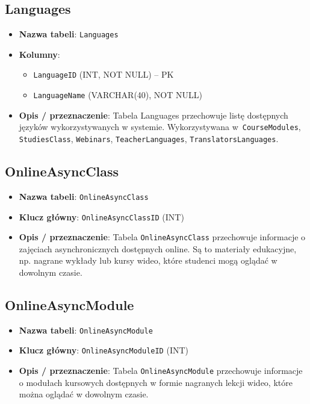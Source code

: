 \documentclass[12pt]{article}
\begin{document}
\subsection{Languages}
\begin{itemize}
    \item \textbf{Nazwa tabeli}: \texttt{Languages}
    \item \textbf{Kolumny}:
          \begin{itemize}
            \item \texttt{LanguageID} (INT, NOT NULL) -- PK
            \item \texttt{LanguageName} (VARCHAR(40), NOT NULL)
          \end{itemize}
    \item \textbf{Opis / przeznaczenie}:  
          Tabela Languages przechowuje listę dostępnych języków wykorzystywanych w systemie. Wykorzystywana w~\texttt{CourseModules}, \texttt{StudiesClass}, \texttt{Webinars}, \texttt{TeacherLanguages}, \texttt{TranslatorsLanguages}.
\end{itemize}

\subsection{OnlineAsyncClass}
\begin{itemize}
    \item \textbf{Nazwa tabeli}: \texttt{OnlineAsyncClass}
    \item \textbf{Klucz główny}: \texttt{OnlineAsyncClassID} (INT)
    \item \textbf{Opis / przeznaczenie}:  
          Tabela \texttt{OnlineAsyncClass} przechowuje informacje o zajęciach asynchronicznych dostępnych online. Są to materiały edukacyjne, np. nagrane wykłady lub kursy wideo, które studenci mogą oglądać w dowolnym czasie.
\end{itemize}

\subsection{OnlineAsyncModule}
\begin{itemize}
    \item \textbf{Nazwa tabeli}: \texttt{OnlineAsyncModule}
    \item \textbf{Klucz główny}: \texttt{OnlineAsyncModuleID} (INT)
    \item \textbf{Opis / przeznaczenie}:  
          Tabela \texttt{OnlineAsyncModule} przechowuje informacje o modułach kursowych dostępnych w formie nagranych lekcji wideo, które można oglądać w dowolnym czasie.
\end{itemize}
\end{document}
